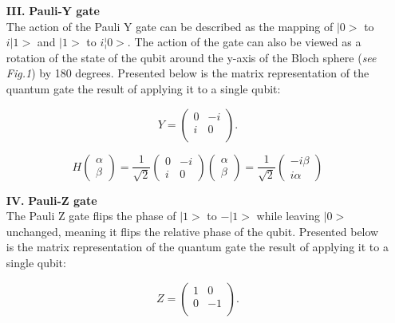\documentclass[onecolumn,10pt,cleanfoot]{asme2ej}
\begin{document}
\begin{enumerate}
	\item[\textbf{III.}] \textbf{Pauli-Y gate} \\
		The action of the Pauli Y gate can be described as the mapping of $|0>$ to $i|1>$ and $|1>$ to $i¦0>$. The action of the gate can also be viewed as a rotation of the state of the qubit around the y-axis of the Bloch sphere (\textit{see Fig.1}) by 180 degrees. Presented below is the matrix representation of the quantum gate the result of applying it to a single qubit:

		\begin{equation*}
			Y = \begin{pmatrix}
			0 & -i \\
			i & 0 \\
		\end{pmatrix}.
	\end{equation*}

	\begin{equation*}
		H \begin{pmatrix}
		\alpha \\
		\beta
		\end{pmatrix}
		=
		\frac{1}{\sqrt{2}}\begin{pmatrix}
		0 & -i \\
		i & 0
		\end{pmatrix}
		\begin{pmatrix}
		\alpha \\
		\beta
		\end{pmatrix}
		=
		\frac{1}{\sqrt{2}}\begin{pmatrix}
		-i\beta \\
		i\alpha
		\end{pmatrix}
	\end{equation*}


	\item[\textbf{IV.}] \textbf{Pauli-Z gate} \\
		The Pauli Z gate flips the phase of $|1>$ to $-|1>$ while leaving $|0>$ unchanged, meaning it flips the relative phase of the qubit. Presented below is the matrix representation of the quantum gate the result of applying it to a single qubit:

		\begin{equation*}
			Z = \begin{pmatrix}
			1 & 0 \\
			0 & -1 \\
		\end{pmatrix}.
	\end{equation*} 


\end{enumerate}
\end{document}
